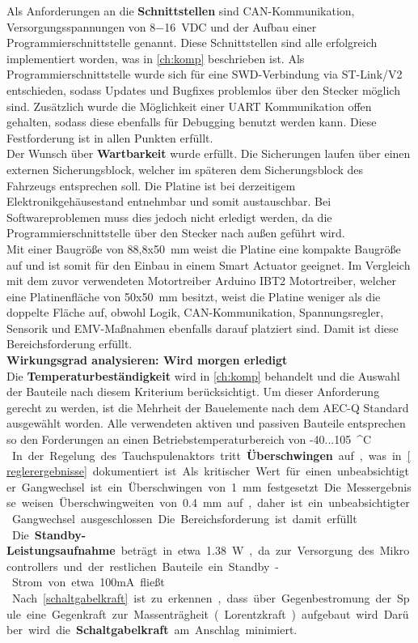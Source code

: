 Als Anforderungen an die \textbf{Schnittstellen} sind CAN-Kommunikation, Versorgungsspannungen von \SI{8-16}{VDC} und der Aufbau einer Programmierschnittstelle genannt. Diese Schnittstellen sind alle erfolgreich implementiert worden, was in \autoref{ch:komp} beschrieben ist. Als Programmierschnittstelle wurde sich für eine SWD-Verbindung via ST-Link/V2 entschieden, sodass Updates und Bugfixes problemlos über den Stecker möglich sind. Zusätzlich wurde die Möglichkeit einer UART Kommunikation offen gehalten, sodass diese ebenfalls für Debugging benutzt werden kann. Diese Festforderung ist in allen Punkten erfüllt.\\
Der Wunsch über \textbf{Wartbarkeit} wurde erfüllt. Die Sicherungen laufen über einen externen Sicherungsblock, welcher im späteren dem Sicherungsblock des Fahrzeugs entsprechen soll. Die Platine ist bei derzeitigem Elektronikgehäusestand entnehmbar und somit austauschbar. Bei Softwareproblemen muss dies jedoch nicht erledigt werden, da die Programmierschnittstelle über den Stecker nach außen geführt wird. \\
Mit einer Baugröße von 88,8x\SI{50}{mm} weist die Platine eine kompakte Baugröße auf und ist somit für den Einbau in einem Smart Actuator geeignet. Im Vergleich mit dem zuvor verwendeten Motortreiber Arduino IBT2 Motortreiber, welcher eine Platinenfläche von 50x\SI{50}{mm} besitzt, weist die Platine weniger als die doppelte Fläche auf, obwohl Logik, CAN-Kommunikation, Spannungsregler, Sensorik und EMV-Maßnahmen ebenfalls darauf platziert sind. Damit ist diese Bereichsforderung erfüllt. \\
\textbf{Wirkungsgrad analysieren: Wird morgen erledigt}\\
Die \textbf{Temperaturbeständigkeit} wird in \autoref{ch:komp} behandelt und die Auswahl der Bauteile nach diesem Kriterium berücksichtigt. Um dieser Anforderung gerecht zu werden, ist die Mehrheit der Bauelemente nach dem AEC-Q Standard ausgewählt worden. Alle verwendeten aktiven und passiven Bauteile entsprechen so den Forderungen an einen Betriebstemperaturbereich von -40...\SI{105}{^\circ C}.\\
In der Regelung des Tauchspulenaktors tritt \textbf{Überschwingen} auf, was in \autoref{reglerergebnisse} dokumentiert ist. Als kritischer Wert für einen unbeabsichtigter Gangwechsel ist ein Überschwingen von \SI{1}{mm} festgesetzt. Die Messergebnisse weisen Überschwingweiten von \SI{0,4}{mm} auf, daher ist ein unbeabsichtigter Gangwechsel ausgeschlossen. Die Bereichsforderung ist damit erfüllt.\\
Die \textbf{Standby-Leistungsaufnahme} beträgt in etwa \SI{1,38}{W}, da zur Versorgung des Mikrocontrollers und der restlichen Bauteile ein Standby-Strom von etwa 100mA fließt.\\
Nach \autoref{schaltgabelkraft} ist zu erkennen, dass über Gegenbestromung der Spule eine Gegenkraft zur Massenträgheit (Lorentzkraft) aufgebaut wird. Darüber wird die \textbf{Schaltgabelkraft} am Anschlag minimiert.

